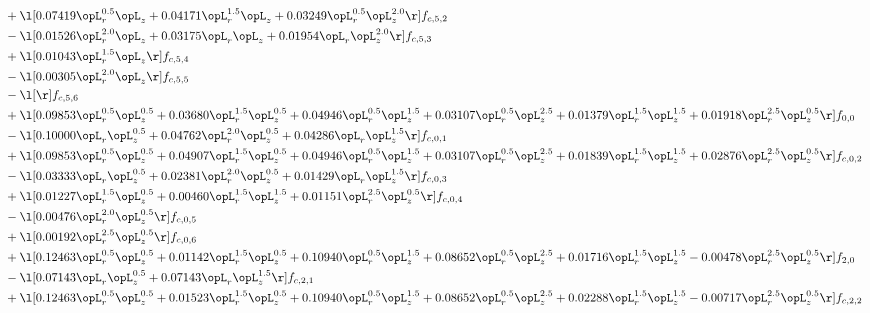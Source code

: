\begin{alignat}{2}
& + \l[  0.07419 \opL_r^{0.5} \opL_z +  0.04171 \opL_r^{1.5} \opL_z +  0.03249 \opL_r^{0.5} \opL_z^{2.0}  \r] f_{c,5,2} \nonumber \\ 
& - \l[  0.01526 \opL_r^{2.0} \opL_z +  0.03175 \opL_r \opL_z +  0.01954 \opL_r \opL_z^{2.0}  \r] f_{c,5,3} \nonumber \\ 
& + \l[  0.01043 \opL_r^{1.5} \opL_z  \r] f_{c,5,4} \nonumber \\ 
& - \l[  0.00305 \opL_r^{2.0} \opL_z  \r] f_{c,5,5} \nonumber \\ 
& - \l[  \r] f_{c,5,6} \nonumber \\ 
& + \l[  0.09853 \opL_r^{0.5} \opL_z^{0.5} +  0.03680 \opL_r^{1.5} \opL_z^{0.5} +  0.04946 \opL_r^{0.5} \opL_z^{1.5} +  0.03107 \opL_r^{0.5} \opL_z^{2.5} +  0.01379 \opL_r^{1.5} \opL_z^{1.5} +  0.01918 \opL_r^{2.5} \opL_z^{0.5}  \r] f_{0,0} \nonumber \\ 
& - \l[  0.10000 \opL_r \opL_z^{0.5} +  0.04762 \opL_r^{2.0} \opL_z^{0.5} +  0.04286 \opL_r \opL_z^{1.5}  \r] f_{c,0,1} \nonumber \\ 
& + \l[  0.09853 \opL_r^{0.5} \opL_z^{0.5} +  0.04907 \opL_r^{1.5} \opL_z^{0.5} +  0.04946 \opL_r^{0.5} \opL_z^{1.5} +  0.03107 \opL_r^{0.5} \opL_z^{2.5} +  0.01839 \opL_r^{1.5} \opL_z^{1.5} +  0.02876 \opL_r^{2.5} \opL_z^{0.5}  \r] f_{c,0,2} \nonumber \\ 
& - \l[  0.03333 \opL_r \opL_z^{0.5} +  0.02381 \opL_r^{2.0} \opL_z^{0.5} +  0.01429 \opL_r \opL_z^{1.5}  \r] f_{c,0,3} \nonumber \\ 
& + \l[  0.01227 \opL_r^{1.5} \opL_z^{0.5} +  0.00460 \opL_r^{1.5} \opL_z^{1.5} +  0.01151 \opL_r^{2.5} \opL_z^{0.5}  \r] f_{c,0,4} \nonumber \\ 
& - \l[  0.00476 \opL_r^{2.0} \opL_z^{0.5}  \r] f_{c,0,5} \nonumber \\ 
& + \l[  0.00192 \opL_r^{2.5} \opL_z^{0.5}  \r] f_{c,0,6} \nonumber \\ 
& + \l[  0.12463 \opL_r^{0.5} \opL_z^{0.5} +  0.01142 \opL_r^{1.5} \opL_z^{0.5} +  0.10940 \opL_r^{0.5} \opL_z^{1.5} +  0.08652 \opL_r^{0.5} \opL_z^{2.5} +  0.01716 \opL_r^{1.5} \opL_z^{1.5}   -0.00478 \opL_r^{2.5} \opL_z^{0.5}  \r] f_{2,0} \nonumber \\ 
& - \l[  0.07143 \opL_r \opL_z^{0.5} +  0.07143 \opL_r \opL_z^{1.5}  \r] f_{c,2,1} \nonumber \\ 
& + \l[  0.12463 \opL_r^{0.5} \opL_z^{0.5} +  0.01523 \opL_r^{1.5} \opL_z^{0.5} +  0.10940 \opL_r^{0.5} \opL_z^{1.5} +  0.08652 \opL_r^{0.5} \opL_z^{2.5} +  0.02288 \opL_r^{1.5} \opL_z^{1.5}   -0.00717 \opL_r^{2.5} \opL_z^{0.5}  \r] f_{c,2,2} \nonumber \\ 

\end{alignat}
